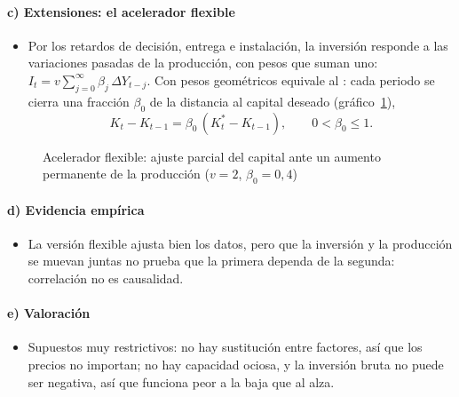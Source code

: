 \documentclass[11pt]{article}
\begin{document}
\paragraph{c) Extensiones: el acelerador flexible}

\begin{itemize}
\item Por los retardos de decisión, entrega e instalación, la inversión responde a las variaciones pasadas de la producción, con pesos que suman uno: $I_t=v\sum_{j=0}^{\infty}\beta_j\,\Delta Y_{t-j}$. Con pesos geométricos\nocite{Koyck1954Distributed} equivale al \nocite{Chenery1952Overcapacity}: cada periodo se cierra una fracción $\beta_0$ de la distancia al capital deseado (gráfico~\ref{fig:acelerador-flexible}),
  \begin{equation*}
  K_t-K_{t-1}=\beta_0\,(K^*_t-K_{t-1}),\qquad 0<\beta_0\leq 1.
  \end{equation*}
\end{itemize}

\begin{figure}[H]
\centering
\caption{Acelerador flexible: ajuste parcial del capital ante un aumento permanente de la producción ($v=2$, $\beta_0=0{,}4$)}\label{fig:acelerador-flexible}
\end{figure}

\paragraph{d) Evidencia empírica}

\begin{itemize}
\item La versión flexible ajusta bien los datos, pero que la inversión y la producción se muevan juntas no prueba que la primera dependa de la segunda: correlación no es causalidad.
\end{itemize}

\paragraph{e) Valoración}

\begin{itemize}
\item Supuestos muy restrictivos: no hay sustitución entre factores, así que los precios no importan; no hay capacidad ociosa, y la inversión bruta no puede ser negativa, así que funciona peor a la baja que al alza.
\end{itemize}
\end{document}
